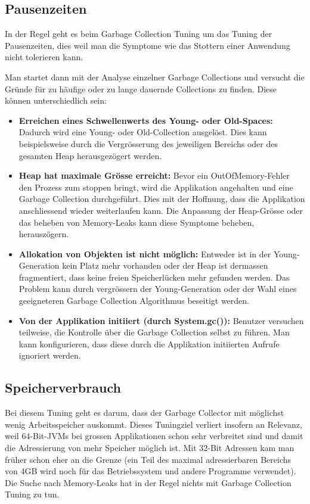 \subsection{Pausenzeiten\label{gc_tuning_pausenzeiten}}
In der Regel geht es beim Garbage Collection Tuning um das Tuning der Pausenzeiten, dies weil man die Symptome wie das Stottern einer Anwendung nicht tolerieren kann. 

Man startet dann mit der Analyse einzelner Garbage Collections und versucht die Gründe für zu häufige oder zu lange dauernde Collections zu finden. Diese können unterschiedlich sein:
\begin{itemize}
\item \textbf{Erreichen eines Schwellenwerts des Young- oder Old-Spaces:} Dadurch wird eine Young- oder Old-Collection ausgelöst. Dies kann beispielsweise durch die Vergrösserung des jeweiligen Bereichs oder des gesamten Heap herausgezögert werden.
\item \textbf{Heap hat maximale Grösse erreicht:} Bevor ein OutOfMemory-Fehler den Prozess zum stoppen bringt, wird die Applikation angehalten und eine Garbage Collection durchgeführt. Dies mit der Hoffnung, dass die Applikation anschliessend wieder weiterlaufen kann. Die Anpassung der Heap-Grösse oder das beheben von Memory-Leaks kann diese Symptome beheben, herauszögern.
\item \textbf{Allokation von Objekten ist nicht möglich:} Entweder ist in der Young-Generation kein Platz mehr vorhanden oder der Heap ist dermassen fragmentiert, dass keine freien Speicherlücken mehr gefunden werden. Das Problem kann durch vergrössern der Young-Generation oder der Wahl eines geeigneteren Garbage Collection Algorithmus beseitigt werden.
\item \textbf{Von der Applikation initiiert (durch System.gc()):} Benutzer versuchen teilweise, die Kontrolle über die Garbage Collection selbst zu führen. Man kann konfigurieren, dass diese durch die Applikation initiierten Aufrufe ignoriert werden.
\end{itemize}



\subsection{Speicherverbrauch\label{gc_tuning_speicherverbrauch}}
Bei diesem Tuning geht es darum, dass der Garbage Collector mit möglichst wenig Arbeitsspeicher auskommt.
Dieses Tuningziel verliert insofern an Relevanz, weil 64-Bit-JVMs bei grossen Applikationen schon sehr verbreitet sind und damit die Adressierung von mehr Speicher möglich ist. Mit 32-Bit Adressen kam man früher schon eher an die Grenze (ein Teil des maximal adressierbaren Bereichs von 4GB wird noch für das Betriebssystem und andere Programme verwendet). Die Suche nach Memory-Leaks hat in der Regel nichts mit Garbage Collection Tuning zu tun.

